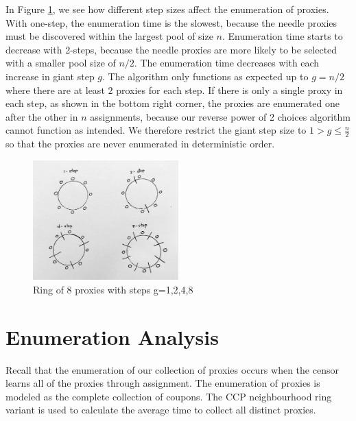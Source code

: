 In Figure \ref{fig:8ring}, we see how different step sizes affect the enumeration of proxies. With one-step, the enumeration time is the slowest, because the needle proxies must be discovered within the largest pool of size $n$. Enumeration time starts to decrease with 2-steps, because the needle proxies are more likely to be selected with a smaller pool size of $n/2$. The enumeration time decreases with each increase in giant step $g$. The algorithm only functions as expected up to $g=n/2$ where there are at least $2$ proxies for each step. If there is only a single proxy in each step, as shown in the bottom right corner, the proxies are enumerated one after the other in $n$ assignments, because our reverse power of 2 choices algorithm cannot function as intended. We therefore restrict the giant step size to $1>g\leq \frac{n}{2}$ so that the proxies are never enumerated in deterministic order.

\begin{figure}[h!]
\centering
     \includegraphics[width=0.5\textwidth]{fig/8_ring.png}
    \caption{Ring of 8 proxies with steps g=1,2,4,8}

    \label{fig:8ring}
\end{figure}
 
\section{Enumeration Analysis}

Recall that the enumeration of our collection of proxies occurs when the censor learns all of the proxies through assignment. The enumeration of proxies is modeled as the complete collection of coupons. The CCP neighbourhood ring variant is used to calculate the average time to collect all distinct proxies.
 

